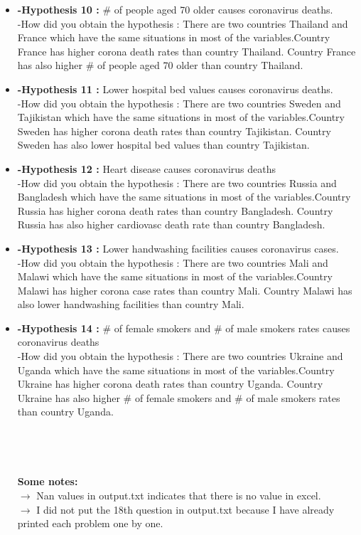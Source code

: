 \documentclass[a4 paper]{article}
\numberwithin{equation}{section}
\newcommand{\0}{\mathbf{0}}
\begin{document}
\begin{itemize}
	\item\textbf{-Hypothesis 10 :}  \# of people aged 70 older causes coronavirus deaths.\\
        -How did you obtain the hypothesis : There are two countries Thailand and France which have the same situations in most of the variables.Country France has higher corona death rates than country Thailand. Country France has also higher \# of people aged 70 older than country Thailand.
	\item\textbf{-Hypothesis 11 :} Lower hospital bed values causes coronavirus deaths.\\
        -How did you obtain the hypothesis : There are two countries Sweden and Tajikistan which have the same situations in most of the variables.Country Sweden has higher corona death rates than country Tajikistan. Country Sweden has also lower hospital bed values than country Tajikistan.
	\item\textbf{-Hypothesis 12 :} Heart disease causes coronavirus deaths\\
        -How did you obtain the hypothesis : There are two countries Russia and Bangladesh which have the same situations in most of the variables.Country Russia has higher corona death rates than country Bangladesh. Country Russia has also higher cardiovasc death rate than country Bangladesh.
	\item\textbf{-Hypothesis 13 :}  Lower handwashing facilities causes coronavirus cases.\\
        -How did you obtain the hypothesis : There are two countries Mali and Malawi which have the same situations in most of the variables.Country Malawi has higher corona case rates than country Mali. Country Malawi has also lower handwashing facilities than country Mali.
	\item\textbf{-Hypothesis 14 :} \# of female smokers and \# of male smokers rates causes coronavirus deaths\\
        -How did you obtain the hypothesis : There are two countries Ukraine and Uganda which have the same situations in most of the variables.Country Ukraine has higher corona death rates than country Uganda. Country Ukraine has also higher \# of female smokers and \# of male smokers rates than country Uganda.
\\\\\\\\\\
\textbf{Some notes:}\\
$\rightarrow${ Nan values in output.txt indicates that there is no value in excel.}\\
$\rightarrow${ I did not put the 18th question in output.txt because I have already printed each problem one by one.}
	
\end{itemize}
\end{document}
